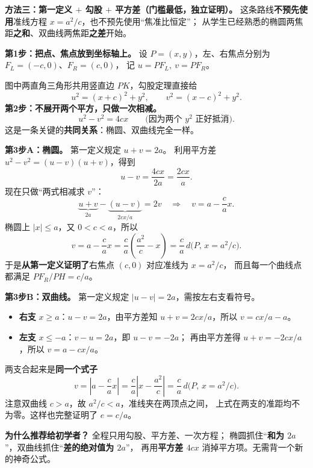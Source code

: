 \begin{proofbox}
\textbf{方法三：第一定义 $+$ 勾股 $+$ 平方差（门槛最低，独立证明）。}
这条路线\textbf{不预先使用}准线方程 $x=a^2/c$，也不预先使用“焦准比恒定”；
从学生已经熟悉的椭圆两焦距\textbf{之和}、双曲线两焦距\textbf{之差}开始。

\medskip
\textbf{第1步：把点、焦点放到坐标轴上。}
设 $P=(x,y)$，左、右焦点分别为 $F_L=(-c,0)$、$F_R=(c,0)$，
记 $u=PF_L,\ v=PF_R$。

图中两直角三角形共用竖直边 $PK$，勾股定理直接给
\[
 u^2=(x+c)^2+y^2,\qquad v^2=(x-c)^2+y^2.
\]
\textbf{第2步：不展开两个平方，只做一次相减。}
\[
 \boxed{u^2-v^2=4cx}\qquad
 \bigl(\text{因为两个 }y^2\text{ 正好抵消}\bigr).
\]
这是一条关键的\textbf{共同关系}：椭圆、双曲线完全一样。

\medskip
\end{proofbox}
\clearpage
\begin{proofbox}
\textbf{第3步A：椭圆。} 第一定义规定 $u+v=2a$。
利用平方差 $u^2-v^2=(u-v)(u+v)$，得到
\[
 u-v=\frac{4cx}{2a}=\frac{2cx}{a}.
\]
现在只做“两式相减求 $v$”：
\[
 \underbrace{u+v}_{2a}-\underbrace{(u-v)}_{2cx/a}=2v
 \quad\Longrightarrow\quad \boxed{v=a-\frac ca x}.
\]
椭圆上 $|x|\le a$，又 $0<c<a$，所以
\[
 v=a-\frac ca x
 =\frac ca\left(\frac{a^2}{c}-x\right)
 =\frac ca\,d\bigl(P,\,x=a^2/c\bigr).
\]
于是\textbf{从第一定义证明了}右焦点 $(c,0)$ 对应准线为 $x=a^2/c$，
而且每一个曲线点都满足 $PF_R/PH=c/a$。

\medskip
\textbf{第3步B：双曲线。} 第一定义规定 $|u-v|=2a$，需按左右支看符号。
\begin{itemize}
 \item \textbf{右支} $x\ge a$：$u-v=2a$，由平方差知
 $u+v=2cx/a$，所以 $v=cx/a-a$。
 \item \textbf{左支} $x\le-a$：$v-u=2a$，即 $u-v=-2a$；
 再由平方差得 $u+v=-2cx/a$，所以 $v=a-cx/a$。
\end{itemize}
两支合起来是\textbf{同一个式子}
\[
 \boxed{v=\left|a-\frac ca x\right|}
 =\frac ca\left|x-\frac{a^2}{c}\right|
 =\frac ca\,d\bigl(P,\,x=a^2/c\bigr).
\]
注意双曲线 $c>a$，故 $a^2/c<a$，准线夹在两顶点之间，
上式在两支的准距均不为零。这样也完整证明了 $e=c/a$。

\medskip
\textbf{为什么推荐给初学者？} 全程只用勾股、平方差、一次方程；
椭圆抓住“\textbf{和为 $2a$}”，双曲线抓住“\textbf{差的绝对值为 $2a$}”，
再用\textbf{平方差 $4cx$} 消掉平方项。无需背一个新的神奇公式。
\end{proofbox}
\clearpage

